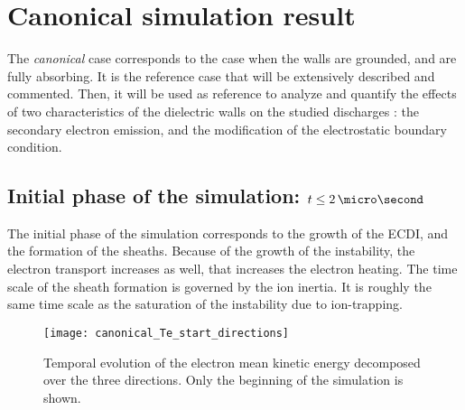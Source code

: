 
\section{Canonical simulation result}
  \label{sec-canonical}
  
  
  The {\it canonical} case corresponds to the case when the walls are grounded, and are fully absorbing. 
  It is the reference case that will be extensively described and commented.
  Then, it will be used as reference to analyze and quantify the effects of two characteristics of the dielectric walls on the studied discharges : the secondary electron emission, and the modification of the electrostatic boundary condition.
  
  \subsection{Initial phase of the simulation: $t \leq 2\,\micro\second$} \label{subsec-initlaphase}
  
  The initial phase of the simulation corresponds to the growth of the \ac{ECDI}, and the formation of the sheaths.
  Because of the growth of the instability, the electron transport increases as well, that increases the electron heating.
  The time scale of the sheath formation is governed by the ion inertia.
  It is roughly the same time scale as the saturation of the instability due to ion-trapping.
  
  \begin{figure}[hbt]
    \centering
    \texttt{[image: canonical\_Te\_start\_directions]}
    \caption{Temporal evolution of the electron mean kinetic energy decomposed over the three directions. Only the beginning of the simulation is shown.}
    \label{fig-canon_Te_strat}
  \end{figure}
  
